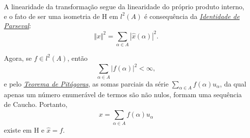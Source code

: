 \documentclass[../functional_analysis.tex]{subfiles}
\begin{document}
 \begin{proof*}
   A linearidade da transformação segue da linearidade do próprio produto interno, e o fato de ser uma isometria de H em \(l^{2}(A)\) é consequência da \hyperlink{parseval_identity}{\textit{Identidade de Parseval}}: 
     \[
       \Vert x \Vert^{2} = \sum\limits_{\alpha \in A}^{}| \hat{x}(\alpha ) |^{2}. 
     \]

     Agora, se \(f\in l^{2}(A)\), então 
       \[
         \sum\limits_{\alpha \in A}^{} | f(\alpha ) |^{2}<\infty,
       \]
       e pelo \hyperlink{pythagorean_theorem}{\textit{Teorema de Pitágoras}}, as somas parciais da série \(\sum\limits_{\alpha \in A}^{}f(\alpha )u_{\alpha }\), da qual apenas um número enumerável de termos são não nulos, formam uma sequência de Caucho. Portanto, 
         \[
           x = \sum\limits_{\alpha \in A}^{}f(\alpha )u_{\alpha }
         \]
         existe em H e \(\hat{x}=f.\) \qedsymbol
 \end{proof*}
  
\end{document}
